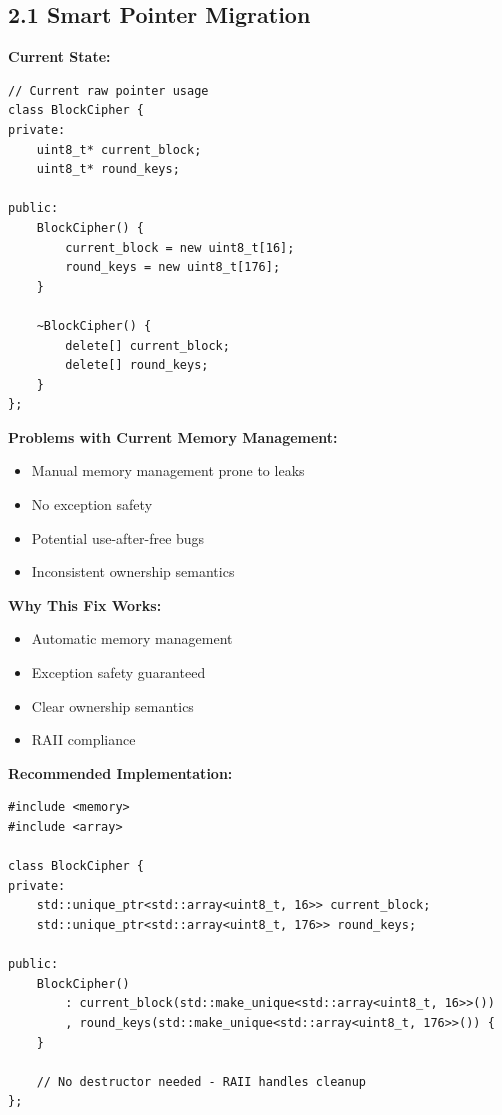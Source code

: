 \documentclass[11pt,a4paper]{article}
\begin{document}
\subsection{2.1 Smart Pointer Migration}

\textbf{Current State:}
\begin{lstlisting}
// Current raw pointer usage
class BlockCipher {
private:
    uint8_t* current_block;
    uint8_t* round_keys;
    
public:
    BlockCipher() {
        current_block = new uint8_t[16];
        round_keys = new uint8_t[176];
    }
    
    ~BlockCipher() {
        delete[] current_block;
        delete[] round_keys;
    }
};
\end{lstlisting}

\textcolor{problemred}{\textbf{Problems with Current Memory Management:}}
\begin{itemize}
    \item Manual memory management prone to leaks
    \item No exception safety
    \item Potential use-after-free bugs
    \item Inconsistent ownership semantics
\end{itemize}

\textcolor{solutiongreen}{\textbf{Why This Fix Works:}}
\begin{itemize}
    \item Automatic memory management
    \item Exception safety guaranteed
    \item Clear ownership semantics
    \item RAII compliance
\end{itemize}

\textbf{Recommended Implementation:}
\begin{lstlisting}
#include <memory>
#include <array>

class BlockCipher {
private:
    std::unique_ptr<std::array<uint8_t, 16>> current_block;
    std::unique_ptr<std::array<uint8_t, 176>> round_keys;
    
public:
    BlockCipher() 
        : current_block(std::make_unique<std::array<uint8_t, 16>>())
        , round_keys(std::make_unique<std::array<uint8_t, 176>>()) {
    }
    
    // No destructor needed - RAII handles cleanup
};
\end{lstlisting}
\end{document}
